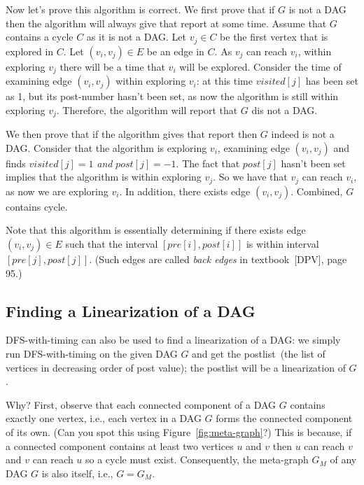 Now let's prove this algorithm is correct.
We first prove that if $G$ is not a DAG then the algorithm will always give that report at some time.
Assume that $G$ contains a cycle $C$ as it is not a DAG.
Let $v_j \in C$ be the first vertex that is explored in $C$.
Let $(v_i, v_j) \in E$ be an edge in $C$.
As $v_j$ can reach $v_i$, within exploring $v_j$ there will be a time that $v_i$ will be explored.
Consider the time of examining edge $(v_i,v_j)$ within exploring $v_i$: at this time $visited[j]$ has been set as 1,
but its post-number hasn't been set, as now the algorithm is still within exploring $v_j$.
Therefore, the algorithm will report that $G$ dis not a DAG. 

We then prove that if the algorithm gives that report then $G$ indeed is not a DAG.
Consider that the algorithm is exploring $v_i$, examining edge $(v_i, v_j)$ and 
finds $visited[j] = 1$ \emph{and} $post[j] = -1$.
The fact that $post[j]$ hasn't been set implies that the algorithm is within exploring $v_j$.
So we have that $v_j$ can reach $v_i$, as now we are exploring $v_i$.
In addition, there exists edge $(v_i, v_j)$. Combined, $G$ contains cycle.

Note that this algorithm is essentially determining if there exists edge $(v_i, v_j) \in E$
such that the interval $[pre[i], post[i]]$ is within interval $[pre[j], post[j]]$.
(Such edges are called \emph{back edges} in textbook~[DPV], page 95.)


\subsection*{Finding a Linearization of a DAG}

DFS-with-timing can also be used to find a linearization of a DAG: we simply run DFS-with-timing on the given DAG $G$
and get the postlist~(the list of vertices in decreasing order of post value); the postlist will be a linearization of $G$.

Why? First, observe that each connected component of a DAG $G$ contains exactly one vertex, i.e., each vertex in a DAG $G$
forms the connected component of its own. (Can you spot this using Figure~\ref{fig:meta-graph}?)
This is because, if a connected component contains at least two vertices $u$ and $v$ then $u$ can reach $v$ and $v$ can reach $u$ so a cycle must exist.
Consequently, the meta-graph $G_M$ of any DAG $G$ is also itself, i.e., $G= G_M$. %

